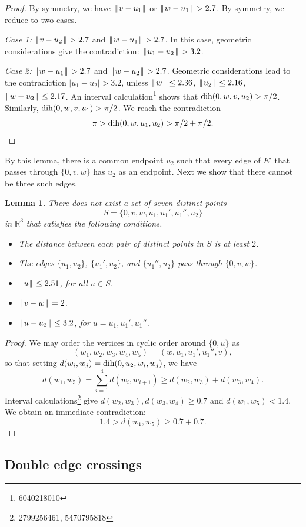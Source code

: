 \documentclass[11pt]{amsart}
\def\op#1{{\text{#1}}}
\newcommand{\ring}[1]{\mathbb{#1}}
\def\dih{\op{dih}}
\def\text{\hbox}
\def\|{{\hskip0.1em|\hskip-0.15em|\hskip0.1em}}
\newtheorem{lemma}{Lemma}
\begin{document}
\begin{proof}
By symmetry, we have $\|v-u_1\|$ or $\|w-u_1\|>2.7$.  By symmetry, we reduce to two cases.

{\it Case 1:}  $\|v-u_2\|>2.7$ and $\|w-u_1\|> 2.7$.  In this case, geometric considerations
give the contradiction:  $\|u_1-u_2\| > 3.2$.

{\it Case 2:}  $\|w-u_1\|>2.7$ and $\|w-u_2\|>2.7$.  Geometric considerations lead to the contradiction
$|u_1-u_2|>3.2$, unless $\|w\|\le 2.36$, $\|u_2\|\le 2.16$, $\|w-u_2\|\le 2.17$.  An interval calculation\footnote{6040218010}
shows that
$\op{dih}(0,w,v,u_2)>\pi/2$.
Similarly, $\op{dih}(0,w,v,u_1)>\pi/2$.  We reach the contradiction
$$
\pi > \op{dih}(0,w,u_1,u_2) > \pi/2 + \pi/2.
$$
\end{proof}

By this lemma, there is a common endpoint $u_2$ such that every edge
of $E'$ that passes through $\{0,v,w\}$ has $u_2$ as an endpoint.
Next we show that there cannot be three such edges.  


\begin{lemma}\label{lemma:three-edge}
There does not exist a set of seven distinct points
$$S=\{0,v,w,u_1,u_1',u_1'',u_2\}$$ in $\ring{R}^3$ that satisfies
the following conditions.
\begin{itemize}
\item The distance between each pair of distinct points in $S$ is at least $2$.
\item The edges $\{u_1,u_2\}$, $\{u_1',u_2\}$, and $\{u_1'',u_2\}$ pass through
$\{0,v,w\}$.
\item $\|u\|\le 2.51$, for all $u\in S$.
\item $\|v-w\|=2$.
\item $\|u-u_2\|\le 3.2$, for $u=u_1,u_1',u_1''$.
\end{itemize}
\end{lemma}

\begin{proof}
We may order the vertices in cyclic order around $\{0,u\}$ as
$$(w_1,w_2,w_3,w_4,w_5)=(w,u_1,u_1',u_1'',v),$$ 
so that setting
$d(w_i,w_j) = \dih(0,u_2,w_i,w_j)$, we have
$$d(w_1,w_5)=\sum_{i=1}^4 d(w_i,w_{i+1})\ge d(w_2,w_3)+d(w_3,w_4).$$
Interval calculations\footnote{2799256461, 5470795818} 
give $d(w_2,w_3),d(w_3,w_4)\ge 0.7$
and $d(w_1,w_5)< 1.4$. We obtain an immediate contradiction:
$$1.4 > d(w_1,w_5) \ge 0.7 + 0.7.$$
\end{proof}

\subsection*{Double edge crossings}
\end{document}
